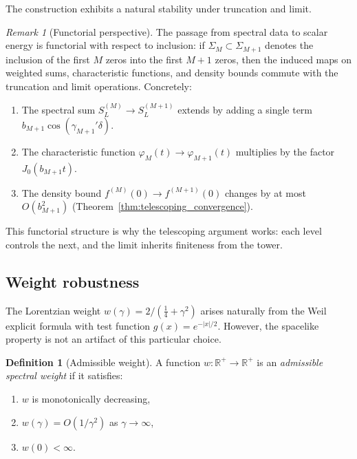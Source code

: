 \documentclass[12pt,reqno]{amsart}
\theoremstyle{plain}
\theoremstyle{definition}
\newtheorem{definition}[theorem]{Definition}
\theoremstyle{remark}
\newtheorem{remark}[theorem]{Remark}
\newcommand{\R}{\mathbb{R}}
\newcommand{\quarter}{\tfrac{1}{4}}
\begin{document}
The construction exhibits a natural stability under truncation and limit.

\begin{remark}[Functorial perspective]
The passage from spectral data to scalar energy is functorial with respect to inclusion: if $\Sigma_M \subset \Sigma_{M+1}$ denotes the inclusion of the first $M$ zeros into the first $M+1$ zeros, then the induced maps on weighted sums, characteristic functions, and density bounds commute with the truncation and limit operations. Concretely:
\begin{enumerate}[label=\textup{(\roman*)}]
\item The spectral sum $S_L^{(M)} \to S_L^{(M+1)}$ extends by adding a single term $b_{M+1}\cos(\gamma_{M+1}'\delta)$.
\item The characteristic function $\varphi_M(t) \to \varphi_{M+1}(t)$ multiplies by the factor $J_0(b_{M+1}t)$.
\item The density bound $f^{(M)}(0) \to f^{(M+1)}(0)$ changes by at most $O(b_{M+1}^2)$ (Theorem~\ref{thm:telescoping_convergence}).
\end{enumerate}
This functorial structure is why the telescoping argument works: each level controls the next, and the limit inherits finiteness from the tower.
\end{remark}

\subsection{Weight robustness}\label{subsec:weight-robustness}

The Lorentzian weight $w(\gamma) = 2/(\quarter + \gamma^2)$ arises naturally from the Weil explicit formula with test function $g(x) = e^{-|x|/2}$. However, the spacelike property is not an artifact of this particular choice.

\begin{definition}[Admissible weight]\label{def:admissible-weight}
A function $w: \R^+ \to \R^+$ is an \emph{admissible spectral weight} if it satisfies:
\begin{enumerate}[label=\textup{(\roman*)}]
\item $w$ is monotonically decreasing,
\item $w(\gamma) = O(1/\gamma^2)$ as $\gamma \to \infty$,
\item $w(0) < \infty$.
\end{enumerate}
\end{definition}
\end{document}

